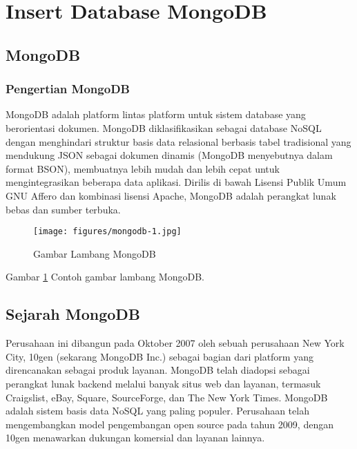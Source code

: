 
\section {Insert Database MongoDB}

\subsection {MongoDB}
\subsubsection {Pengertian MongoDB}
MongoDB adalah platform lintas platform untuk sistem database yang berorientasi  dokumen. 
MongoDB diklasifikasikan sebagai database NoSQL dengan menghindari struktur basis data relasional berbasis tabel tradisional yang mendukung JSON sebagai dokumen dinamis (MongoDB menyebutnya dalam format BSON), membuatnya lebih mudah dan lebih cepat untuk mengintegrasikan beberapa data aplikasi. 
Dirilis di bawah Lisensi Publik Umum GNU Affero dan kombinasi lisensi Apache, MongoDB adalah perangkat lunak bebas dan sumber terbuka.

	\begin{figure}[ht]
	\centerline{\texttt{[image: figures/mongodb-1.jpg]}}
	\caption{Gambar Lambang MongoDB}
	\label{Gambar}
	\end{figure}
      
      Gambar \ref{Gambar} Contoh gambar lambang MongoDB.

\subsection {Sejarah MongoDB}
Perusahaan ini dibangun pada Oktober 2007 oleh sebuah perusahaan New York City, 10gen (sekarang MongoDB Inc.) sebagai bagian dari platform yang direncanakan sebagai produk layanan.
MongoDB telah diadopsi sebagai perangkat lunak backend melalui banyak situs web dan layanan, termasuk Craigslist, eBay, Square, SourceForge, dan The New York Times. MongoDB adalah sistem basis data NoSQL yang paling populer. 
Perusahaan telah mengembangkan model pengembangan open source pada tahun 2009, dengan 10gen menawarkan dukungan komersial dan layanan lainnya.

